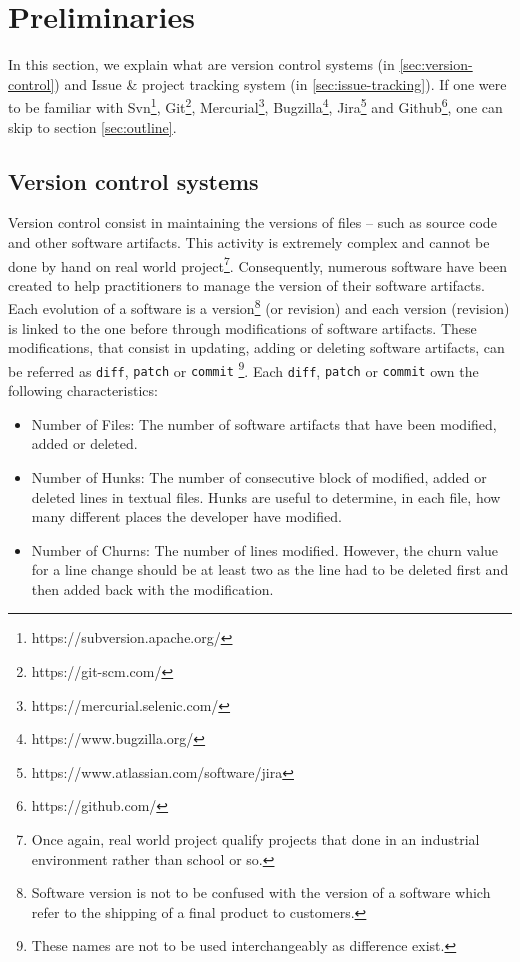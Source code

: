 \section{Preliminaries\label{sec:preliminaries}}


In this section, we explain what are version control systems (in \ref{sec:version-control}) and Issue \& project tracking system (in \ref{sec:issue-tracking}). If one were to be familiar with Svn\footnote{https://subversion.apache.org/}, Git\footnote{https://git-scm.com/}, Mercurial\footnote{https://mercurial.selenic.com/}, Bugzilla\footnote{https://www.bugzilla.org/}, Jira\footnote{https://www.atlassian.com/software/jira} and Github\footnote{https://github.com/}, one can skip to section \ref{sec:outline}.

\subsection{Version control systems\label{sec:version-control}}

Version control consist in maintaining the versions of files -- such as source code and other software artifacts.
This activity is extremely complex and cannot be done by hand on real world project\footnote{Once again, real world project qualify projects that done in an industrial environment rather than school or so.}.
Consequently, numerous software have been created to help practitioners to manage the version of their software artifacts.
Each evolution of a software is a version\footnote{Software version is not to be confused with the version of a software which refer to the shipping of a final product to customers.} (or revision) and each version (revision) is linked to the one before through modifications of software artifacts.
These modifications, that consist in updating, adding or deleting software artifacts, can be referred as \texttt{diff}, {\tt patch} or {\tt commit}
\footnote{These names are not to be used interchangeably as difference exist.}.
Each \texttt{diff}, {\tt patch} or {\tt commit} own the following characteristics:

\begin{itemize}
\item Number of Files: The number of software artifacts that have been modified, added or deleted.
\item Number of Hunks: The number of consecutive block of modified, added or deleted lines in textual files. Hunks are useful to determine, in each file, how many different places the developer have modified.
\item Number of Churns:  The number of lines modified. However, the churn value for a line change should be at least two as the line had to be deleted first and then added back with the modification.
\end{itemize}

